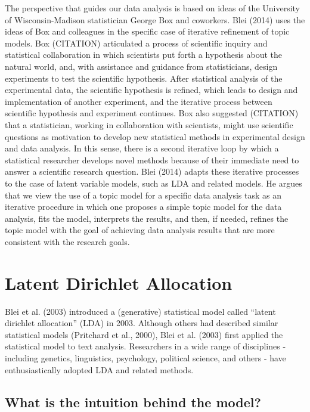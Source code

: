 \documentclass[12pt,]{article}
\begin{document}
The perspective that guides our data analysis is based on ideas of the
University of Wisconsin-Madison statistician George Box and coworkers.
Blei (2014) uses the ideas of Box and colleagues in the specific case of
iterative refinement of topic models. Box
(CITATION)
articulated a process of scientific inquiry and statistical
collaboration in which scientists put forth a hypothesis about the
natural world, and, with assistance and guidance from statisticians,
design experiments to test the scientific hypothesis. After statistical
analysis of the experimental data, the scientific hypothesis is refined,
which leads to design and implementation of another experiment, and the
iterative process between scientific hypothesis and experiment
continues. Box also suggested (CITATION) that a statistician, working in
collaboration with scientists, might use scientific questions as
motivation to develop new statistical methods in experimental design and
data analysis. In this sense, there is a second iterative loop by which
a statistical researcher develops novel methods because of their
immediate need to answer a scientific research question. Blei (2014)
adapts these iterative processes to the case of latent variable models,
such as LDA and related models. He argues that we view the use of a
topic model for a specific data analysis task as an iterative procedure
in which one proposes a simple topic model for the data analysis, fits
the model, interprets the results, and then, if needed, refines the
topic model with the goal of achieving data analysis results that are
more consistent with the research goals.

\section{Latent Dirichlet Allocation}\label{latent-dirichlet-allocation}

Blei et al. (2003) introduced a (generative) statistical model called
``latent dirichlet allocation'' (LDA) in 2003. Although others had
described similar statistical models (Pritchard et al., 2000), Blei et
al. (2003) first applied the statistical model to text analysis.
Researchers in a wide range of disciplines - including genetics,
linguistics, psychology, political science, and others - have
enthusiastically adopted LDA and related methods.

\subsection{What is the intuition behind the
model?}\label{what-is-the-intuition-behind-the-model}
\end{document}
